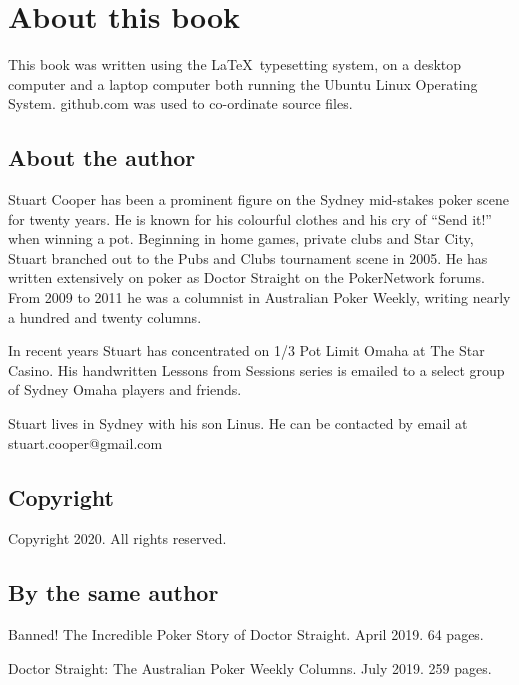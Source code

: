 \chapter*{About this book}


This book was written using the \LaTeX\ typesetting system, on a
desktop computer and a laptop computer both running the Ubuntu
Linux Operating System. github.com was used to co-ordinate source
files.

\section*{About the author}

Stuart Cooper has been a prominent figure on the Sydney mid-stakes poker
scene for twenty years. He is known for his colourful clothes
and his cry of ``Send it!'' when winning a pot.
Beginning in home games, private clubs
and Star City, Stuart branched out to the Pubs and Clubs tournament
scene in 2005. He has written extensively on poker
as Doctor Straight on the PokerNetwork forums. From
2009 to 2011 he was a columnist in Australian Poker Weekly,
writing nearly a hundred and twenty columns.

In recent years Stuart has concentrated on 1/3 Pot Limit Omaha at
The Star Casino. His handwritten Lessons from Sessions series is
emailed to a select group of Sydney Omaha players and friends.

Stuart lives in Sydney with his son Linus. He
can be contacted by email at stuart.cooper@gmail.com

\section*{Copyright}

Copyright 2020. All rights reserved.

\section*{By the same author}

Banned! The Incredible Poker Story of Doctor Straight. April 2019. 64 pages.

Doctor Straight: The Australian Poker Weekly Columns. July 2019. 259 pages.
